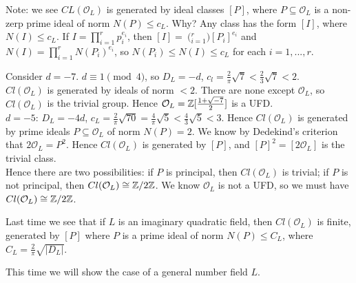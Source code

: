 \documentclass[a4paper]{article}
\begin{document}
Note: we see $CL(\mathcal{O}_L)$ is generated by ideal classes $[P]$, where $P \subseteq \mathcal{O}_L$ is a non-zerp prime ideal of norm $N(P) \leq c_L$. Why? Any class has the form $[I]$, where $N(I) \leq c_L$. If $I = \prod_{i=1}^r p_i^{e_i}$, then $[I] = \pod_{i=1}^r [P_i]^{e_i}$ and $N(I) = \prod_{i=1}^r N(P_i)^{e_i}$, so $N(P_i) \leq N(I) \leq c_L$ for each $i=1,...,r$.

\begin{eg}
Consider $d=-7$. $d \equiv 1\pmod 4$, so $D_L = -d$, $c_l = \frac{2}{\pi} \sqrt{7} < \frac{2}{3} \sqrt{7} < 2$.\\
$Cl(\mathcal{O}_L)$ is generated by ideals of norm $<2$. There are none except $\mathcal{O}_L$, so $Cl(\mathcal{O}_L)$ is the trivial group. Hence $\mathcal{O}_L = \mathbb{Z}[\frac{1+\sqrt{-7}}{2}]$ is a UFD.\\
$d=-5$: $D_L = -4d$, $c_L = \frac{2}{\pi} \sqrt{70} = \frac{4}{\pi} \sqrt{5} < \frac{4}{3}\sqrt{5} < 3$. Hence $Cl(\mathcal{O}_L)$ is generated by prime ideals $P \subseteq \mathcal{O}_L$ of norm $N(P) = 2$. We know by Dedekind's criterion that $2\mathcal{O}_L = P^2$. Hence $Cl(\mathcal{O}_L)$ is generated by $[P]$, and $[P]^2 = [2\mathcal{O}_L]$ is the trivial class.\\
Hence there are two possibilities: if $P$ is principal, then $Cl(\mathcal{O}_L)$ is trivial; if $P$ is not principal, then $Cl(\mathcal{O}_L) \cong \mathbb{Z}/2\mathbb{Z}$. We know $\mathcal{O}_L$ is not a UFD, so we must have $Cl(\mathcal{O}_L) \cong \mathbb{Z}/2\mathbb{Z}$.
\end{eg}

Last time we see that if $L$ is an imaginary quadratic field, then $Cl(\mathcal{O}_L)$ is finite, generated by $[P]$ where $P$ is a prime ideal of norm $N(P) \leq C_L$, where $C_L = \frac{2}{\pi} \sqrt{|D_L|}$.

This time we will show the case of a general number field $L$.
\end{document}
